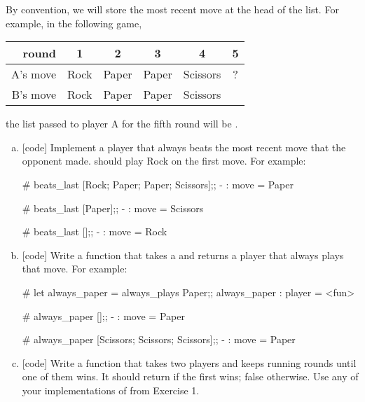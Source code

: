 \documentclass{pset}
\begin{document}
By convention, we will store the most recent move at the head of the
list.  For example, in the following game,

\begin{center}
\begin{tabular}{rccccc}
round    &  1 & 2 & 3 & 4 & 5 \\
\hline
A's move & Rock & Paper & Paper & Scissors & ? \\
B's move & Rock & Paper & Paper & Scissors &   \\
\end{tabular}
\end{center}

the list passed to player A for the fifth round will be
.

\begin{enumerate}[(a)]
\item{} [code] Implement a player  that always beats
  the most recent move that the opponent made.  
  should play Rock on the first move.  For example:

\begin{ocaml}
# beats_last [Rock; Paper; Paper; Scissors];;
- : move = Paper

# beats_last [Paper];;
- : move = Scissors

# beats_last [];;
- : move = Rock
\end{ocaml}

\item{} [code] Write a function  that takes a  and returns
      a player that always plays that move.  For example:
\begin{ocaml}
# let always_paper = always_plays Paper;;
always_paper : player = <fun>

# always_paper [];;
- : move = Paper

# always_paper [Scissors; Scissors; Scissors];;
- : move = Paper
\end{ocaml}

\item{} [code] Write a function  that takes two players
  and keeps running rounds until one of them wins.  It should return
   if the first wins; false otherwise.  Use any of your
  implementations of  from Exercise 1.
\end{enumerate}
\end{document}
